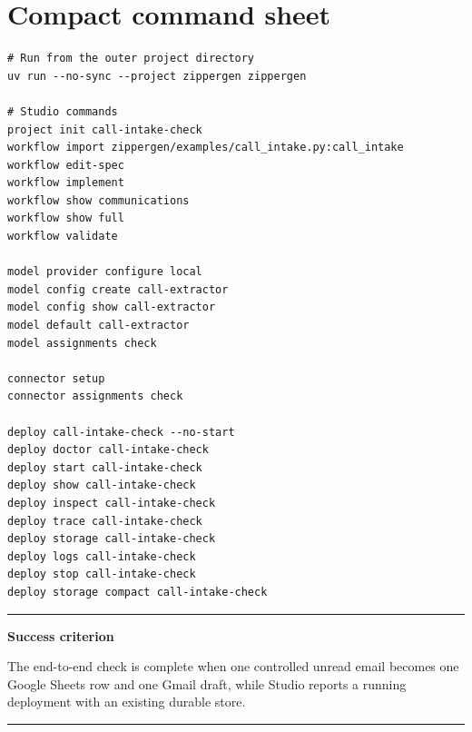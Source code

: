 \documentclass[11pt,a4paper]{article}
\newenvironment{notebox}[1]
{\begin{center}\begin{minipage}{0.94\linewidth}
 \color{ZipperInk}\hrule\vspace{5pt}\textbf{#1}\par\smallskip}
{\vspace{5pt}\hrule\end{minipage}\end{center}}
\begin{document}
\section{Compact command sheet}

\begin{lstlisting}[style=shell]
# Run from the outer project directory
uv run --no-sync --project zippergen zippergen

# Studio commands
project init call-intake-check
workflow import zippergen/examples/call_intake.py:call_intake
workflow edit-spec
workflow implement
workflow show communications
workflow show full
workflow validate

model provider configure local
model config create call-extractor
model config show call-extractor
model default call-extractor
model assignments check

connector setup
connector assignments check

deploy call-intake-check --no-start
deploy doctor call-intake-check
deploy start call-intake-check
deploy show call-intake-check
deploy inspect call-intake-check
deploy trace call-intake-check
deploy storage call-intake-check
deploy logs call-intake-check
deploy stop call-intake-check
deploy storage compact call-intake-check
\end{lstlisting}

\begin{notebox}{Success criterion}
The end-to-end check is complete when one controlled unread email becomes one
Google Sheets row and one Gmail draft, while Studio reports a running
deployment with an existing durable store.
\end{notebox}
\end{document}
